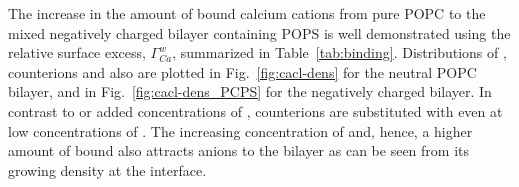 \documentclass[12pt,a4paper,twoside,openright]{report}
\begin{document}
 





The increase in the amount of bound calcium cations from pure POPC to the mixed negatively charged bilayer containing POPS
is well demonstrated using the relative surface excess, $\Gamma ^w _{Ca}$,
summarized in Table~\ref{tab:binding}. 
Distributions of ,  counterions and also  
are plotted in Fig.~\ref{fig:cacl-dens} for the neutral POPC bilayer, 
and in Fig.~\ref{fig:cacl-dens_PCPS} for the negatively charged bilayer. 
In contrast to  or added concentrations of , 
 counterions are substituted with  even at low concentrations of . 
The increasing concentration of  and, hence, a higher amount of bound 
also attracts  anions to the bilayer 
as can be seen from its growing density at the interface. 
\end{document}
